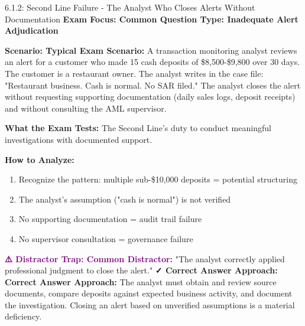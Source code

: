 \documentclass[11pt,a4paper]{beamer}
\newcommand{\examfocus}[1]{\textcolor{orange!80!black}{\textbf{Exam Focus: #1}}}
\newcommand{\trap}[1]{\textcolor{purple}{\textbf{⚠️ Distractor Trap: #1}}}
\newcommand{\correct}[1]{\textcolor{green!50!black}{\textbf{✓ Correct Answer Approach: #1}}}
\newcommand{\scenario}[1]{\textcolor{blue!70!black}{\textbf{Scenario: #1}}}
\begin{document}
	\begin{frame}{6.1.2: Second Line Failure - The Analyst Who Closes Alerts Without Documentation}
		\examfocus{Common Question Type: Inadequate Alert Adjudication}
		
		\scenario{Typical Exam Scenario:}
		A transaction monitoring analyst reviews an alert for a customer who made 15 cash deposits of \$8,500-\$9,800 over 30 days. The customer is a restaurant owner. The analyst writes in the case file: "Restaurant business. Cash is normal. No SAR filed." The analyst closes the alert without requesting supporting documentation (daily sales logs, deposit receipts) and without consulting the AML supervisor.
		
		\textbf{What the Exam Tests:} The Second Line's duty to conduct meaningful investigations with documented support.
		
		\textbf{How to Analyze:}
		\begin{enumerate}
			\item Recognize the pattern: multiple sub-\$10,000 deposits = potential structuring
			\item The analyst's assumption ("cash is normal") is not verified
			\item No supporting documentation = audit trail failure
			\item No supervisor consultation = governance failure
		\end{enumerate}
		
		\trap{Common Distractor:} "The analyst correctly applied professional judgment to close the alert."
		\correct{Correct Answer Approach:} The analyst must obtain and review source documents, compare deposits against expected business activity, and document the investigation. Closing an alert based on unverified assumptions is a material deficiency.
	\end{frame}
	
\end{document}
